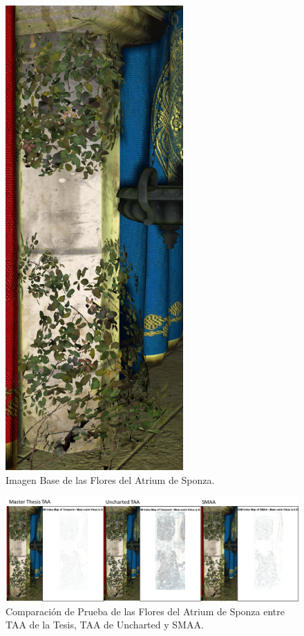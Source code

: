 \documentclass[pregrado]{tesis-usb} %
\begin{document}
\begin{figure}[!htb]
	\centering
	\includegraphics[scale=0.2]{images/results/sponza_flowers_sobel_ground_truth.png}
	\caption{Imagen Base de las Flores del Atrium de Sponza.}\label{fig:sponza_flowers_truth}
\end{figure}

\begin{figure}[!htb]
	\centering
	\includegraphics[scale=0.9]{images/results/sponza_flowers.png}
	\caption{Comparación de Prueba de las Flores del Atrium de Sponza entre TAA de la Tesis, TAA de Uncharted y SMAA.}\label{fig:sponza_flowers_render}
\end{figure}
\end{document}
